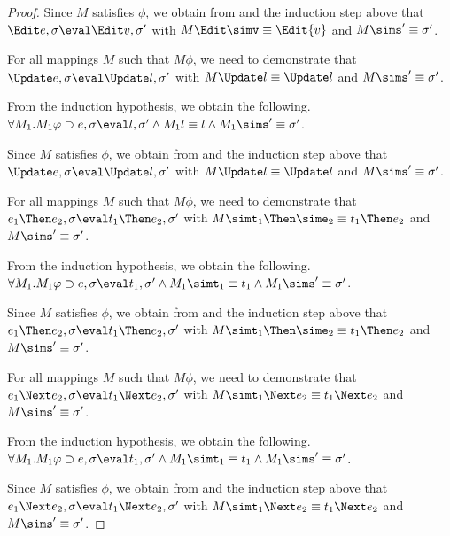 \begin{proof}
{  Since $M$ satisfies $\phi$,
  we obtain from  and the induction step above that $\Edit e,\sigma\eval\Edit v,\sigma'$ with $M \Edit \simv\equiv \Edit {v}$ and $ M\sims'\equiv{\sigma'}$.

  }

  {For all mappings $M$ such that $M\phi$, we need to demonstrate that $\Update e,\sigma\eval\Update l,\sigma'$ with
  $M \Update l \equiv \Update l$ and $M\sims'\equiv{\sigma'}$.

  From the induction hypothesis, we obtain the following.
  $\forall M_1 .  M_1\phi \implies e, \sigma {\eval}l,{\sigma'}\land  M_1 l\equiv l \land  M_1\sims'\equiv{\sigma'}$.

  Since $M$ satisfies $\phi$,
  we obtain from  and the induction step above that $\Update e,\sigma\eval\Update l,\sigma'$ with $M \Update l\equiv \Update l$ and $M \sims' \equiv{\sigma'}$.

  }

  {For all mappings $M$ such that $M\phi$, we need to demonstrate that
  $e_1\Then e_2,\sigma\eval t_1\Then e_2,\sigma'$ with
  $M \simt_1\Then \sime_2 \equiv {t_1}\Then e_2$ and $M\sims'\equiv{\sigma'}$.

  From the induction hypothesis, we obtain the following.
  $\forall M_1 .  M_1\phi \implies e, \sigma {\eval}{t_1},{\sigma'}\land  M_1 \simt_1\equiv {t_1} \land  M_1\sims'\equiv{\sigma'}$.

  Since $M$ satisfies $\phi$,
  we obtain from  and the induction step above that $e_1\Then e_2,\sigma\eval t_1\Then e_2,\sigma'$ with $M \simt_1\Then \sime_2 \equiv {t_1}\Then e_2$ and $M \sims' \equiv\sigma'$.

  }

  {For all mappings $M$ such that $M\phi$, we need to demonstrate that
  $e_1\Next e_2,\sigma\eval t_1\Next e_2,\sigma'$ with
  $M \simt_1\Next e_2 \equiv {t_1}\Next e_2$ and $M\sims'\equiv{\sigma'}$.

  From the induction hypothesis, we obtain the following.
  $\forall M_1 .  M_1\phi \implies e,\sigma {\eval}{t_1},{\sigma'}\land  M_1 \simt_1\equiv {t_1} \land  M_1\sims'\equiv{\sigma'}$.

  Since $M$ satisfies $\phi$,
  we obtain from  and the induction step above that $e_1\Next e_2,\sigma\eval t_1\Next e_2,\sigma'$ with $M \simt_1\Next e_2 \equiv {t_1}\Next e_2$ and $M \sims' \equiv{\sigma'}$.

}
\end{proof}
